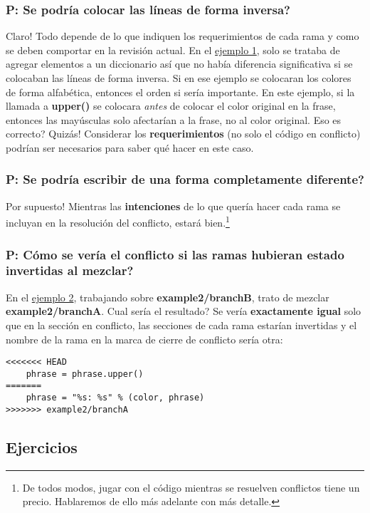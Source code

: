 \subsubsection{P: Se podría colocar las líneas de forma inversa?}
Claro! Todo depende de lo que indiquen los requerimientos de cada rama y como se deben comportar en la revisión actual.
En el \hyperref[example_01]{ejemplo 1}, solo se trataba de agregar elementos a un diccionario así que no había diferencia
significativa si se colocaban las líneas de forma inversa. Si en ese ejemplo se colocaran los colores de forma alfabética,
entonces el orden si sería importante. En este ejemplo, si la llamada a {\bf upper()} se colocara {\it antes} de colocar
el color original en la frase, entonces las mayúsculas solo afectarían a la frase, no al color original. Eso es correcto?
Quizás! Considerar los {\bf requerimientos} (no solo el código en conflicto) podrían ser necesarios para saber qué hacer
en este caso.

\subsubsection{P: Se podría escribir de una forma completamente diferente?}
Por supuesto! Mientras las {\bf intenciones} de lo que quería hacer cada rama se incluyan en la resolución del conflicto,
estará bien.\footnote{De todos modos, jugar con el código mientras se resuelven conflictos tiene un precio. Hablaremos de ello
más adelante con más detalle.}

\subsubsection{P: Cómo se vería el conflicto si las ramas hubieran estado invertidas al mezclar?}
En el \hyperref[example_02]{ejemplo 2}, trabajando sobre {\bf example2/branchB}, trato de mezclar {\bf example2/branchA}.
Cual sería el resultado?
Se vería {\bf exactamente igual} solo que en la sección en conflicto, las secciones de cada rama estarían invertidas
 y el nombre de la rama en la marca de cierre de conflicto sería otra:

\begin{lstlisting}[style=python_style, firstnumber=11, caption={\bf ejemplo 2} - conflicto invertido]
<<<<<<< HEAD
    phrase = phrase.upper()
=======
    phrase = "%s: %s" % (color, phrase)
>>>>>>> example2/branchA
\end{lstlisting}

\subsection{Ejercicios}
